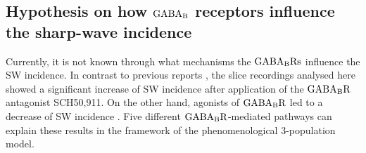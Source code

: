   \subsection{Hypothesis on how $\rm GABA_B$ receptors influence the sharp-wave incidence} 
    Currently, it is not known through what mechanisms the $\rm GABA_BRs$
    influence the SW incidence. In contrast to previous reports
    \citep[e.g.,][]{Hollnagel2014, Hofer2015}, the slice recordings analysed
    here showed a significant increase of SW incidence after application of the
    $\rm GABA_BR$ antagonist SCH50,911. On the other hand, agonists of $\rm
    GABA_BR$ led to a decrease of SW incidence \citep{Robbe2006, Maier2012,
    Hollnagel2014}. Five different $\rm GABA_BR$-mediated pathways can explain
    these results in the framework of the phenomenological 3-population model.
     
